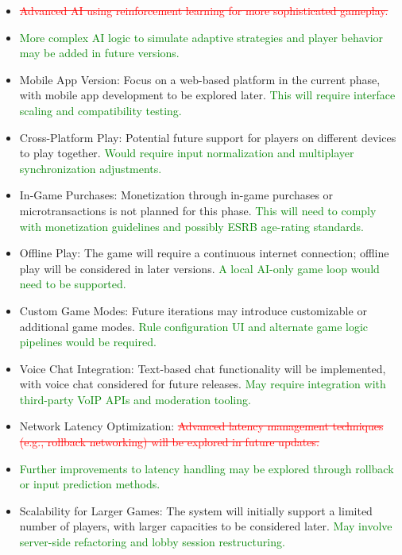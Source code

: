 \documentclass[12pt]{article}
\newcommand{\removed}[1]{\textcolor{red}{\sout{#1}}}
\newcommand{\added}[1]{\textcolor{green}{#1}}
\begin{document}
\begin{itemize}
    \item \removed{Advanced AI using reinforcement learning for more sophisticated gameplay.}
    \item \added{More complex AI logic to simulate adaptive strategies and player behavior may be added in future versions.}
    
    \item Mobile App Version: Focus on a web-based platform in the current phase, with mobile app development to be explored later. \added{This will require interface scaling and compatibility testing.}
    
    \item Cross-Platform Play: Potential future support for players on different devices to play together. \added{Would require input normalization and multiplayer synchronization adjustments.}
    
    \item In-Game Purchases: Monetization through in-game purchases or microtransactions is not planned for this phase. \added{This will need to comply with monetization guidelines and possibly ESRB age-rating standards.}
    
    \item Offline Play: The game will require a continuous internet connection; offline play will be considered in later versions. \added{A local AI-only game loop would need to be supported.}
    
    \item Custom Game Modes: Future iterations may introduce customizable or additional game modes. \added{Rule configuration UI and alternate game logic pipelines would be required.}
    
    \item Voice Chat Integration: Text-based chat functionality will be implemented, with voice chat considered for future releases. \added{May require integration with third-party VoIP APIs and moderation tooling.}
    
    \item Network Latency Optimization: \removed{Advanced latency management techniques (e.g., rollback networking) will be explored in future updates.}
    \item \added{Further improvements to latency handling may be explored through rollback or input prediction methods.}
    
    \item Scalability for Larger Games: The system will initially support a limited number of players, with larger capacities to be considered later. \added{May involve server-side refactoring and lobby session restructuring.}
\end{itemize}
\end{document}
